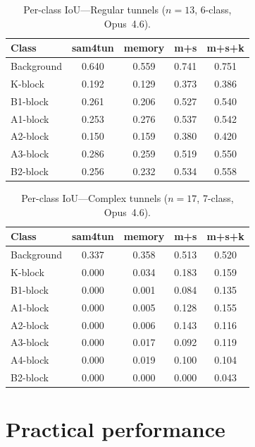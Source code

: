 \documentclass[a4paper,fleqn]{cas-dc}
\begin{document}
\begin{table}[ht]
\caption{Per-class IoU---Regular tunnels ($n=13$, 6-class, Opus~4.6).}\label{tab:perclass-regular}
\begin{tabular*}{\tblwidth}{@{} l c c c c @{}}
\toprule
Class & sam4tun & memory & m+s & m+s+k \\
\midrule
Background & 0.640 & 0.559 & 0.741 & 0.751 \\
K-block & 0.192 & 0.129 & 0.373 & 0.386 \\
B1-block & 0.261 & 0.206 & 0.527 & 0.540 \\
A1-block & 0.253 & 0.276 & 0.537 & 0.542 \\
A2-block & 0.150 & 0.159 & 0.380 & 0.420 \\
A3-block & 0.286 & 0.259 & 0.519 & 0.550 \\
B2-block & 0.256 & 0.232 & 0.534 & 0.558 \\
\bottomrule
\end{tabular*}
\end{table}

\begin{table}[ht]
\caption{Per-class IoU---Complex tunnels ($n=17$, 7-class, Opus~4.6).}\label{tab:perclass-complex}
\begin{tabular*}{\tblwidth}{@{} l c c c c @{}}
\toprule
Class & sam4tun & memory & m+s & m+s+k \\
\midrule
Background & 0.337 & 0.358 & 0.513 & 0.520 \\
K-block & 0.000 & 0.034 & 0.183 & 0.159 \\
B1-block & 0.000 & 0.001 & 0.084 & 0.135 \\
A1-block & 0.000 & 0.005 & 0.128 & 0.155 \\
A2-block & 0.000 & 0.006 & 0.143 & 0.116 \\
A3-block & 0.000 & 0.017 & 0.092 & 0.119 \\
A4-block & 0.000 & 0.019 & 0.100 & 0.104 \\
B2-block & 0.000 & 0.000 & 0.000 & 0.043 \\
\bottomrule
\end{tabular*}
\end{table}

\section{Practical performance}\label{app:practical}
\end{document}
